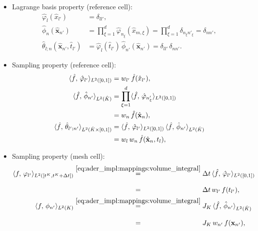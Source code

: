 \documentclass{scrreprt}
\theoremstyle{definition}
\theoremstyle{nonumberplain}
\renewcommand{\vec}[1]{{\textbf{#1}}}
\newcommand{\cell}{K}
\newcommand{\refVec}[1]{\hat{\vec{#1}}}
\newcommand{\refCell}{\hat{\cell}}
\newcommand{\detJ}{J_\cell}
\begin{document}
\begin{itemize}
  \item Lagrange basis property (reference cell):
  \begin{align}
\label{eq:ader_impl:basis:lagrange_ref_1d}
{\hat{\varphi}}_{l} (\hat{x}_{l'}) &= \delta_{ll'},\\
{\hat{\phi}}_{n} (\refVec{x}_{n'}) &= \prod_{\xi=1}^d
{\hat{\varphi}}_{n_{\xi}} (\hat{x}_{m,\xi})
=
\prod_{\xi=1}^{d}
\delta_{n_\xi n'_\xi}
= \delta_{n n'},
\\
{\hat{\theta}}_{l;n} (\refVec{x}_{n'},\hat{t}_{l'}) &=
\hat{\varphi}_{l}(\hat{t}_{l'})\,{\hat{\phi}}_{n'} (\refVec{x}_{n'})
= \delta_{l l'}\,\delta_{n n'}.
\end{align}
\item Sampling property (reference cell):
\begin{align}
\label{eq:ader_impl:basis:sampling_ref_1d}
\langle \hat{f},\,\hat{\varphi}_{l'}\rangle_{L^2([0,1])} &=
w_{l'}\,\hat{f}(\hat{x}_{l'}),
\\
\langle \hat{f},\,\hat{\phi}_{n'}\rangle_{L^2(\refCell)}
&=
\prod_{\xi=1}^d
\langle \hat{f},\,\hat{\varphi}_{n'_\xi}\rangle_{L^2([0,1])}
\notag\\
&=
w_{n}\,
\hat{f}(\refVec{x}_n),
\\
\langle\hat{f},\,\hat{\theta}_{l';n'}\rangle
_{L^2(\refCell\times[0,1])}
&=
\langle \hat{f},\,\hat{\varphi}_{l'}\rangle_{L^2([0,1])}\,
\langle \hat{f},\,\hat{\phi}_{n'}\rangle_{L^2(\refCell)}
\notag
\\
&= w_{l}\,w_{n}\,
\hat{f}(\refVec{x}_n,t_l),
\end{align}
\item Sampling property (mesh cell):
\begin{align}
\label{eq:ader_impl:basis:sampling_mesh_1d}
\langle f,\,\varphi_{l'}\rangle_{L^2([t^\cell,t^\cell+\Delta t])}
&
\overset{\eqref{eq:ader_impl:mappings:volume_integral}}{=}
\Delta t\,
\langle \hat{f},\,\hat{\varphi}_{l'}\rangle_{L^2([0,1])} \\
&\overset{\phantom{\eqref{eq:ader_impl:mappings:volume_integral}}}{=}
\Delta t\,w_{l'}\,f(t_{l'}),
\\
\label{eq:ader_impl:basis:sampling_mesh_3d}
\langle f,\,\phi_{n'}\rangle_{L^2(\cell)}
&\overset{\eqref{eq:ader_impl:mappings:volume_integral}}{=}
\detJ\,
\langle \hat{f},\,\hat{\phi}_{n'}\rangle_{L^2(\refCell)}
\notag\\
&\overset{\phantom{\eqref{eq:ader_impl:mappings:volume_integral}}}{=}
\detJ\,
w_{n'}\,
f(\vec{x}_{n'}),

\end{align}
\end{itemize}
\end{document}
